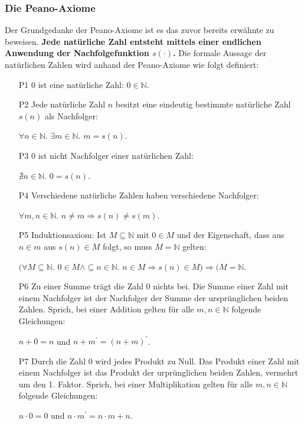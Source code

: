 \documentclass[12pt,a4paper]{article}
\theoremstyle{definition}
\begin{document}
\subsubsection{Die Peano-Axiome}\label{Die Peano-Axiome}
Der Grundgedanke der Peano-Axiome ist es das zuvor bereits erwähnte zu beweisen.
\textbf{Jede natürliche Zahl entsteht mittels einer endlichen Anwendung der Nachfolgefunktion $s(\cdot)$.}\newline
Die formale Aussage der natürlichen Zahlen wird anhand der Peano-Axiome wie folgt definiert:
\begin{itemize}
\item [P1] 0 ist eine natürliche Zahl: $0 \in \mathbb{N}$.
\item [P2] Jede natürliche Zahl $n$ besitzt eine eindeutig bestimmte natürliche Zahl $s(n)$ als Nachfolger:
\begin{center}
$\forall n \in \mathbb{N}$. $\exists m \in \mathbb{N}$. $m = s(n)$.
\end{center}
\item [P3] 0 ist nicht Nachfolger einer natürlichen Zahl:
\begin{center}
$\nexists n \in \mathbb{N}$. $0 = s(n)$.
\end{center}
\item [P4] Verschiedene natürliche Zahlen haben verschiedene Nachfolger:
\begin{center}
$\forall m, n \in \mathbb{N}$. $n \neq m \Rightarrow s(n) \neq s(m)$.
\end{center}
\item [P5] Induktionsaxiom: Ist $M \subseteq \mathbb{N}$ mit $0 \in M$ und der Eigenschaft, dass aus $n \in m$ aus $s(n) \in M$ folgt, so muss $M = \mathbb{N}$ gelten:
\begin{center}
$(\forall M \subseteq \mathbb{N}$. $0 \in M \land \subseteq n \in \mathbb{N}$. $n \in M \Rightarrow s(n) \in M) \Rightarrow (M = \mathbb{N}$.
\end{center}
\item [P6] Zu einer Summe trägt die Zahl 0 nichts bei.
Die Summe einer Zahl mit einem Nachfolger ist der Nachfolger der Summe der ursprünglichen beiden Zahlen.
Sprich, bei einer Addition gelten für alle $m, n \in \mathbb{N}$ folgende Gleichungen:
\begin{center}
$n + 0 = n$ und $n + m^\prime = (n + m)^\prime$.
\end{center}
\item [P7] Durch die Zahl 0 wird jedes Produkt zu Null.
Das Produkt einer Zahl mit einem Nachfolger ist das Produkt der urprünglichen beiden Zahlen, vermehrt um den 1. Faktor.
Sprich, bei einer Multiplikation gelten für alle $m, n \in \mathbb{N}$ folgende Gleichungen:
\begin{center}
$n \cdot 0 = 0$ und $n \cdot m^\prime = n \cdot m + n$.
\end{center}

\end{itemize}
\end{document}
